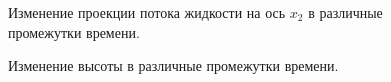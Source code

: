 \documentclass[14pt]{extreport}
\begin{document}
\begin{figure}[H]
  \centering
  \hfill
  \caption{Изменение проекции потока жидкости на ось $x_2$ в различные промежутки времени.}
  \label{img:ex2:q2:all}
\end{figure}

\begin{figure}[H]
  \centering
  \hfill
  \caption{Изменение высоты в различные промежутки времени.}
  \label{img:ex2:H:all}
\end{figure}
\end{document}
